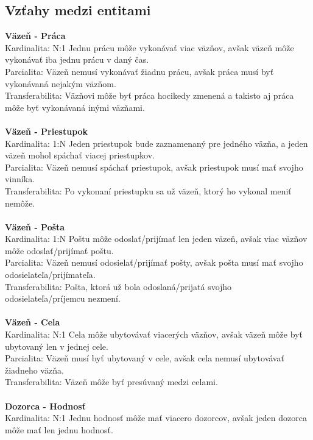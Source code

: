 \documentclass[slovak, 12pt, Times New Roman]{article}
\begin{document}
		\subsection{Vzťahy medzi entitami}
			\textbf{Väzeň - Práca} \\
				Kardinalita: N:1 Jednu prácu môže vykonávať viac väzňov, avšak väzeň môže vykonávať iba jednu prácu v daný čas.\\
				Parcialita: Väzeň nemusí vykonávať žiadnu prácu, avšak práca musí byť vykonávaná nejakým väzňom.\\ 
				Transferabilita: Väzňovi môže byť práca hocikedy zmenená a takisto aj práca môže byť vykonávaná inými väzňami.\\ \\
			\textbf{Väzeň - Priestupok} \\
				Kardinalita: 1:N Jeden priestupok bude zaznamenaný pre jedného väzňa, a jeden väzeň mohol spáchať viacej priestupkov.
				\\
				Parcialita: Väzeň nemusí spáchať priestupok, avšak priestupok musí mať svojho vinníka.\\ 
				Transferabilita: Po vykonaní priestupku sa už väzeň, ktorý ho vykonal meniť nemôže.\\ \\
			\textbf{Väzeň - Pošta} \\
				Kardinalita: 1:N Poštu môže odoslať/prijímať len jeden väzeň, avšak viac väzňov môže odoslať/prijímať poštu.\\
				Parcialita: Väzeň nemusí odosielať/prijímať pošty, avšak pošta musí mať svojho odosielateľa/prijímateľa.\\ 
				Transferabilita: Pošta, ktorá už bola odoslaná/prijatá svojho odosielateľa/príjemcu nezmení.\\ \\
			\textbf{Väzeň - Cela} \\
				Kardinalita: N:1 Cela môže ubytovávať viacerých väzňov, avšak väzeň môže byť ubytovaný len v jednej cele. \\
				Parcialita: Väzeň musí byť ubytovaný v cele, avšak cela nemusí ubytovávať žiadneho väzňa.\\ 
				Transferabilita: Väzeň môže byť presúvaný medzi celami.\\ \\
			\textbf{Dozorca - Hodnosť} \\
				Kardinalita: N:1 Jednu hodnosť môže mať viacero dozorcov, avšak jeden dozorca môže mať len jednu hodnosť.\\
\end{document}
